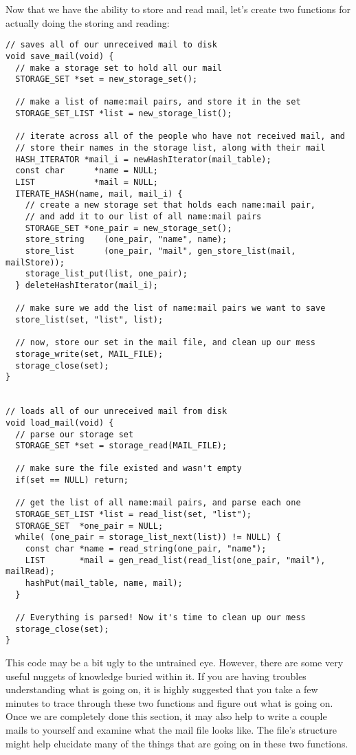 \documentclass[12pt]{article}
\begin{document}
Now that we have the ability to store and read mail, let's create two functions for actually doing the storing and reading:

{\bf \begin{verbatim}
// saves all of our unreceived mail to disk
void save_mail(void) {
  // make a storage set to hold all our mail
  STORAGE_SET *set = new_storage_set();

  // make a list of name:mail pairs, and store it in the set
  STORAGE_SET_LIST *list = new_storage_list();

  // iterate across all of the people who have not received mail, and
  // store their names in the storage list, along with their mail
  HASH_ITERATOR *mail_i = newHashIterator(mail_table);
  const char      *name = NULL;
  LIST            *mail = NULL;
  ITERATE_HASH(name, mail, mail_i) {
    // create a new storage set that holds each name:mail pair,
    // and add it to our list of all name:mail pairs
    STORAGE_SET *one_pair = new_storage_set();
    store_string    (one_pair, "name", name);
    store_list      (one_pair, "mail", gen_store_list(mail, mailStore));
    storage_list_put(list, one_pair);
  } deleteHashIterator(mail_i);

  // make sure we add the list of name:mail pairs we want to save
  store_list(set, "list", list);

  // now, store our set in the mail file, and clean up our mess
  storage_write(set, MAIL_FILE);
  storage_close(set);
}


// loads all of our unreceived mail from disk
void load_mail(void) {
  // parse our storage set
  STORAGE_SET *set = storage_read(MAIL_FILE);

  // make sure the file existed and wasn't empty
  if(set == NULL) return;

  // get the list of all name:mail pairs, and parse each one
  STORAGE_SET_LIST *list = read_list(set, "list");
  STORAGE_SET  *one_pair = NULL;
  while( (one_pair = storage_list_next(list)) != NULL) {
    const char *name = read_string(one_pair, "name");
    LIST       *mail = gen_read_list(read_list(one_pair, "mail"), mailRead);
    hashPut(mail_table, name, mail);
  }

  // Everything is parsed! Now it's time to clean up our mess
  storage_close(set);
}
\end{verbatim}}

This code may be a bit ugly to the untrained eye. However, there are some very useful nuggets of knowledge buried within it. If you are having troubles understanding what is going on, it is highly suggested that you take a few minutes to trace through these two functions and figure out what is going on. Once we are completely done this section, it may also help to write a couple mails to yourself and examine what the mail file looks like. The file's structure might help elucidate many of the things that are going on in these two functions.
\end{document}
